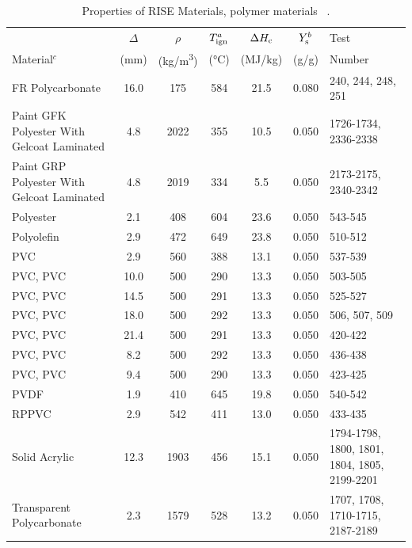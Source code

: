 \clearpage

\begin{table}[!h]
\caption[Properties of RISE Materials, polymer materials]{Properties of RISE Materials, polymer materials ~\cite{RISE:Fire_Database}.}
\centering
\begin{tabular}{|p{5cm}|c|c|c|c|c|p{3.5cm}|}
\hline
                & $\Delta$   & $\rho$     & $T_{\rm{ign}}^{a}$  & $\Delta H_{\rm c}$  & $Y_{\rm s}^{b}$ & Test    \\
Material$^{c}$  & (mm)       & (\unit{kg/m^3}) & (\unit{\degreeCelsius})         & (MJ/kg)             & (g/g)           & Number  \\ \hline
\hline
FR Polycarbonate                                  & 16.0 & 175 & 584 & 21.5 & 0.080 & 240, 244, 248, 251 \\\hline
Paint GFK Polyester With Gelcoat Laminated        & 4.8 & 2022 & 355 & 10.5 & 0.050 & 1726-1734, 2336-2338 \\\hline
Paint GRP Polyester With Gelcoat Laminated        & 4.8 & 2019 & 334 & 5.5 & 0.050 & 2173-2175, 2340-2342 \\\hline
Polyester                                         & 2.1 & 408 & 604 & 23.6 & 0.050 & 543-545 \\\hline
Polyolefin                                        & 2.9 & 472 & 649 & 23.8 & 0.050 & 510-512 \\\hline
PVC                                               & 2.9 & 560 & 388 & 13.1 & 0.050 & 537-539 \\\hline
PVC, PVC                                          & 10.0 & 500 & 290 & 13.3 & 0.050 & 503-505 \\\hline
PVC, PVC                                          & 14.5 & 500 & 291 & 13.3 & 0.050 & 525-527 \\\hline
PVC, PVC                                          & 18.0 & 500 & 292 & 13.3 & 0.050 & 506, 507, 509 \\\hline
PVC, PVC                                          & 21.4 & 500 & 291 & 13.3 & 0.050 & 420-422 \\\hline
PVC, PVC                                          & 8.2 & 500 & 292 & 13.3 & 0.050 & 436-438 \\\hline
PVC, PVC                                          & 9.4 & 500 & 290 & 13.3 & 0.050 & 423-425 \\\hline
PVDF                                              & 1.9 & 410 & 645 & 19.8 & 0.050 & 540-542 \\\hline
RPPVC                                             & 2.9 & 542 & 411 & 13.0 & 0.050 & 433-435 \\\hline
Solid Acrylic                                     & 12.3 & 1903 & 456 & 15.1 & 0.050 & 1794-1798, 1800, 1801, 1804, 1805, 2199-2201 \\\hline
Transparent Polycarbonate                         & 2.3 & 1579 & 528 & 13.2 & 0.050 & 1707, 1708, 1710-1715, 2187-2189 \\\hline
\end{tabular}
\label{Properties_RISE_Materials_Polymers}
\end{table}

